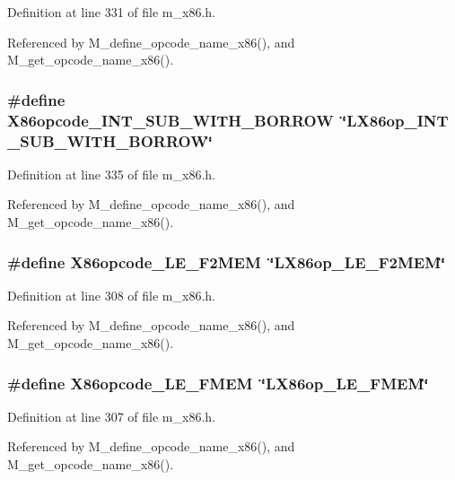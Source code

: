 Definition at line 331 of file m\_\-x86.h.

Referenced by M\_\-define\_\-opcode\_\-name\_\-x86(), and M\_\-get\_\-opcode\_\-name\_\-x86().
\subsubsection{\setlength{\rightskip}{0pt plus 5cm}\#define X86opcode\_\-INT\_\-SUB\_\-WITH\_\-BORROW~\char`\"{}LX86op\_\-INT\_\-SUB\_\-WITH\_\-BORROW\char`\"{}}\label{m__x86_8h_4b9a5736ae05924c47b15a542956e409}




Definition at line 335 of file m\_\-x86.h.

Referenced by M\_\-define\_\-opcode\_\-name\_\-x86(), and M\_\-get\_\-opcode\_\-name\_\-x86().
\subsubsection{\setlength{\rightskip}{0pt plus 5cm}\#define X86opcode\_\-LE\_\-F2MEM~\char`\"{}LX86op\_\-LE\_\-F2MEM\char`\"{}}\label{m__x86_8h_ea2e4a952d3c927a44edebb692954753}




Definition at line 308 of file m\_\-x86.h.

Referenced by M\_\-define\_\-opcode\_\-name\_\-x86(), and M\_\-get\_\-opcode\_\-name\_\-x86().
\subsubsection{\setlength{\rightskip}{0pt plus 5cm}\#define X86opcode\_\-LE\_\-FMEM~\char`\"{}LX86op\_\-LE\_\-FMEM\char`\"{}}\label{m__x86_8h_67f26fe4b430c73f60fae9e7873b13ef}




Definition at line 307 of file m\_\-x86.h.

Referenced by M\_\-define\_\-opcode\_\-name\_\-x86(), and M\_\-get\_\-opcode\_\-name\_\-x86().
